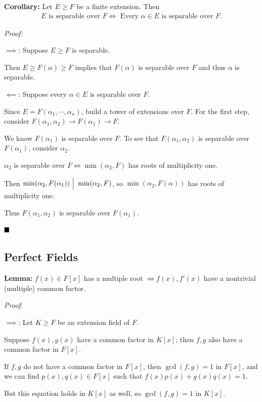 \textbf{Corollary:} Let \(E \geq F\) be a finite extension. Then
\begin{align*}
E \text{ is separable over } F \iff \text{ Every } \alpha \in E \text{ is separable over } F
.\end{align*}

\emph{Proof:}

\(\implies\): Suppose \(E \geq F\) is separable.

Then \(E \geq F(\alpha) \geq F\) implies that \(F(\alpha)\) is separable
over \(F\) and thus \(\alpha\) is separable.

\(\impliedby\): Suppose every \(\alpha \in E\) is separable over \(F\).

Since \(E = F(\alpha_1, \cdots, \alpha_n)\), build a tower of extensions
over \(F\). For the first step, consider
\(F(\alpha_1, \alpha_2) \to F(\alpha_1) \to F\).

We know \(F(\alpha_1)\) is separable over \(F\). To see that
\(F(\alpha_1, \alpha_2)\) is separable over \(F(\alpha_1)\), consider
\(\alpha_2\).

\(\alpha_2\) is separable over \(F \iff \min(\alpha_2, F)\) has roots of
multiplicity one.

Then \(\min(\alpha_2, F(\alpha_1)) {~\Bigm| ~} \min(\alpha_2, F)\), so
\(\min(\alpha_2, F(\alpha))\) has roots of multiplicity one.

Thus \(F(\alpha_1, \alpha_2)\) is separable over \(F(\alpha_1)\).

\(\qed\)

\hypertarget{perfect-fields}{%
\subsection{Perfect Fields}\label{perfect-fields}}

\textbf{Lemma:} \(f(x) \in F[x]\) has a multiple root
\(\iff f(x), f'(x)\) have a nontrivial (multiple) common factor.

\emph{Proof}:

\(\implies\): Let \(K\geq F\) be an extension field of \(F\).

Suppose \(f(x), g(x)\) have a common factor in \(K[x]\); then \(f,g\)
also have a common factor in \(F[x]\).

If \(f, g\) do not have a common factor in \(F[x]\), then
\(\gcd(f, g) = 1\) in \(F[x]\), and we can find \(p(x), q(x) \in F[x]\)
such that \(f(x)p(x) + g(x)q(x) = 1\).

But this equation holds in \(K[x]\) as well, so \(\gcd(f, g) = 1\) in
\(K[x]\).

